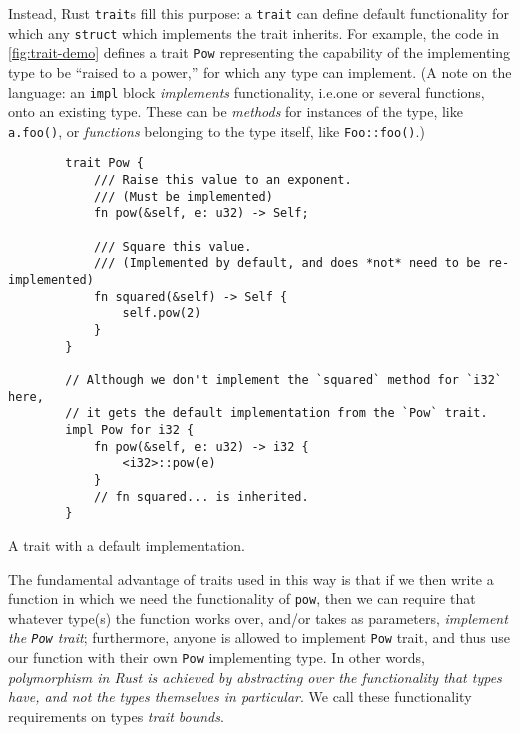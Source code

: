 \documentclass{report}
\newenvironment{code}{\captionsetup{type=listing}}{}
\begin{document}
Instead, Rust \texttt{trait}s fill this purpose: a \texttt{trait} can define default
functionality for which any \texttt{struct} which implements the trait inherits.
For example, the code in \cref{fig:trait-demo} defines a trait \texttt{Pow}
representing the capability of the implementing type to be ``raised to a
power,'' for which any type can implement. (A note on the language: an
\texttt{impl} block \emph{implements} functionality, i.e.\@ one or several
functions, onto an existing type. These can be \emph{methods} for instances of
the type, like \texttt{a.foo()}, or \emph{functions} belonging to the type itself,
like \texttt{Foo::foo()}.)
\begin{code}
    \begin{verbatim}
        trait Pow {
            /// Raise this value to an exponent.
            /// (Must be implemented)
            fn pow(&self, e: u32) -> Self;

            /// Square this value.
            /// (Implemented by default, and does *not* need to be re-implemented)
            fn squared(&self) -> Self {
                self.pow(2)
            }
        }

        // Although we don't implement the `squared` method for `i32` here,
        // it gets the default implementation from the `Pow` trait.
        impl Pow for i32 {
            fn pow(&self, e: u32) -> i32 {
                <i32>::pow(e)
            }
            // fn squared... is inherited.
        }
    \end{verbatim}
    \caption{A trait with a default implementation.}
    \label{fig:trait-demo}
\end{code}
\noindent
The fundamental advantage of traits used in this way is that if we then write a
function in which we need the functionality of \texttt{pow}, then we can require
that whatever type(s) the function works over, and/or takes as parameters,
\emph{implement the \texttt{Pow} trait}; furthermore, anyone is allowed to
implement \texttt{Pow} trait, and thus use our function with their own \texttt{Pow}
implementing type. In other words, \emph{polymorphism in Rust is achieved by
abstracting over the functionality that types have, and not the types
themselves in particular}. We call these functionality requirements on types
\emph{trait bounds}.
\end{document}
